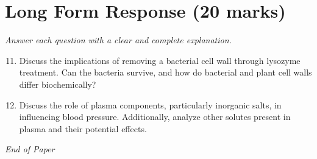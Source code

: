 \documentclass[12pt]{article}
\begin{document}
\section*{Long Form Response (20 marks)}
\textit{Answer each question with a clear and complete explanation.}
\begin{enumerate}[label=\arabic*.]
\setcounter{enumi}{10}
\item Discuss the implications of removing a bacterial cell wall through lysozyme treatment. Can the bacteria survive, and how do bacterial and plant cell walls differ biochemically?
\item Discuss the role of plasma components, particularly inorganic salts, in influencing blood pressure. Additionally, analyze other solutes present in plasma and their potential effects.
\end{enumerate}

\vfill
\noindent\textit{End of Paper}
\end{document}
